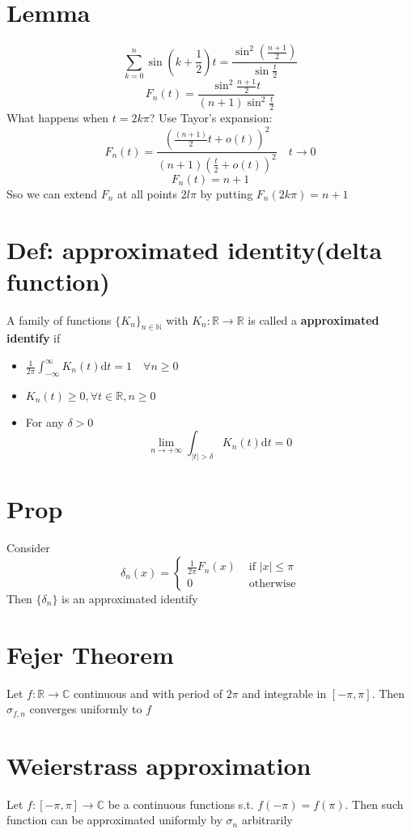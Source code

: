 \documentclass{book}
\newcommand{\abs}[1]{\left\lvert #1 \right\rvert}
\begin{document}
\section{Lemma}
$$\sum\limits_{k=0}^n\sin(k+\frac12)t=\frac{\sin^2\left(\frac{n+1}2\right)}{\sin\frac{t}2}$$
$$F_n(t)=\frac{\sin^2\frac{n+1}2t}{(n+1)\sin^2\frac{t}2}$$
What happens when $t=2k\pi$? Use Tayor's expansion:
$$F_n(t)=\frac{\left(\frac{(n+1)}2t+o(t)\right)^2}{(n+1)\left(\frac{t}2+o(t)\right)^2}\quad t\rightarrow 0$$
$$F_n(t)=n+1$$
Sso we can extend $F_n$ at all points $2l\pi$ by putting $F_n(2k\pi)=n+1$
\section{Def: approximated identity(delta function)}
A family of functions $\{K_n\}_{n\in\mathbb{N}}$ with $K_n:\mathbb{R}\rightarrow \mathbb{R}$ is called a \textbf{approximated identify} if
\begin{itemize}
    \item $\frac{1}{2\pi}\int_{-\infty}^\infty K_n(t)\text{d}t=1\quad \forall n\geq 0$
    \item $K_n(t)\geq 0,\forall t\in \mathbb{R},n\geq 0$
    \item For any $\delta>0$$$\lim\limits_{n\rightarrow+\infty}\int_{\abs{t}>\delta}K_n(t)\text{d}t=0$$

\end{itemize}
\section{Prop}
\label{delta under Fourier}
Consider $$\delta_n(x)=\begin{cases}
    \frac{1}{2\pi}F_n(x)&\text{ if }\abs{x}\leq \pi\\0&\text{ otherwise}
\end{cases}$$
Then $\{\delta_n\}$ is an approximated identify
\section{Fejer Theorem}
Let $f:\mathbb{R}\rightarrow\mathbb{C}$ continuous and with period of $2\pi$ and integrable in $[-\pi,\pi]$. Then $\sigma_{f,n}$ converges uniformly to $f$
\section{Weierstrass approximation}
Let $f:[-\pi,\pi]\rightarrow\mathbb{C}$ be a continuous functions s.t. $f(-\pi)=f(\pi)$. Then such function can be approximated uniformly by $\sigma_n$ arbitrarily
\end{document}
